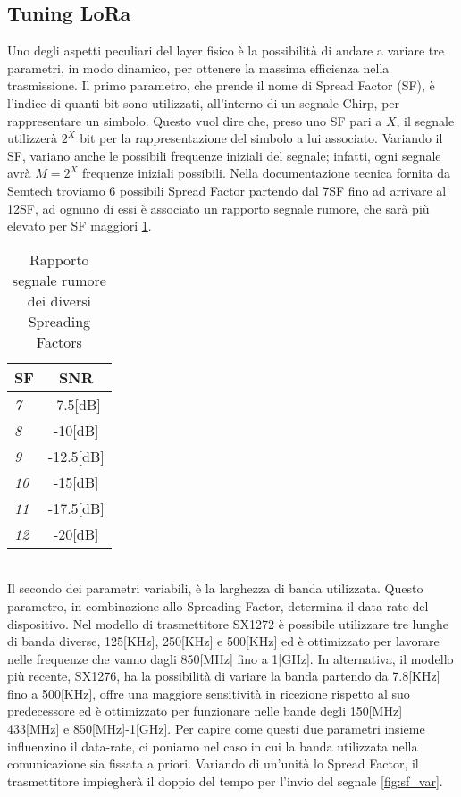 \subsection{Tuning LoRa}
Uno degli aspetti peculiari del layer fisico è la possibilità di andare a
variare tre parametri, in modo dinamico, per ottenere la massima efficienza
nella trasmissione.
Il primo parametro, che prende il nome di Spread Factor (SF),
è l'indice di quanti bit sono utilizzati, all'interno di un segnale Chirp,
per rappresentare  un simbolo. Questo vuol dire che, preso uno 
SF pari a $X$, il segnale  utilizzerà $2^X$ bit per la rappresentazione del simbolo a lui
associato. Variando il SF, variano anche le possibili frequenze iniziali del
segnale; infatti, ogni segnale avrà $M=2^X$ frequenze iniziali possibili.
Nella documentazione tecnica fornita da Semtech troviamo 6 possibili Spread
Factor partendo dal 7SF fino ad arrivare al 12SF, ad ognuno di essi è associato un
rapporto segnale rumore, che sarà più elevato per SF maggiori \ref{tab:SNR}. 
\begin{table}[h]
        \centering
        \begin{tabular}{l|c}
                \textbf{SF}  & SNR \\
                \hline
                \emph{7}  & -7.5[dB] \\
                \emph{8}  & -10[dB]  \\
                \emph{9}   & -12.5[dB]  \\
                \emph{10} & -15[dB] \\
                \emph{11} & -17.5[dB] \\
                \emph{12} & -20[dB] \\
        \end{tabular}
        \caption{Rapporto segnale rumore dei diversi Spreading Factors}
        \label{tab:SNR}
\end{table}
\\
Il secondo dei parametri variabili, è la larghezza di banda utilizzata. Questo
parametro, in  combinazione allo Spreading Factor, determina il data rate del dispositivo.
Nel modello di trasmettitore SX1272 è possibile utilizzare tre lunghe
di banda diverse, 125[KHz],
250[KHz] e 500[KHz] ed è ottimizzato per lavorare nelle frequenze che vanno
dagli  850[MHz] fino a  1[GHz]. In alternativa, il modello più recente, SX1276, ha la possibilità di variare
la banda partendo da 7.8[KHz] fino a 500[KHz], offre una maggiore sensitività in
ricezione rispetto al suo predecessore ed è ottimizzato per funzionare nelle
bande degli 150[MHz] 433[MHz] e 850[MHz]-1[GHz].
Per capire come questi due parametri insieme influenzino il data-rate, 
ci poniamo nel caso in cui la banda utilizzata nella comunicazione sia fissata a priori. 
Variando di un'unità lo Spread Factor,
il trasmettitore impiegherà il doppio del tempo per l'invio del segnale
\ref{fig:sf_var}.

